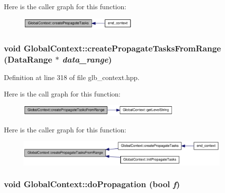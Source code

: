 Here is the caller graph for this function:\nopagebreak
\begin{figure}[H]
\begin{center}
\leavevmode
\includegraphics[width=167pt]{class_global_context_a0f3857165a2d4571d6ae82b86c6becbe_icgraph}
\end{center}
\end{figure}
\hypertarget{class_global_context_a24052ad1a783fc8860d47f6da220c321}{
\subsubsection[{createPropagateTasksFromRange}]{\setlength{\rightskip}{0pt plus 5cm}void GlobalContext::createPropagateTasksFromRange ({\bf DataRange} $\ast$ {\em data\_\-range})}}
\label{class_global_context_a24052ad1a783fc8860d47f6da220c321}


Definition at line 318 of file glb\_\-context.hpp.

Here is the call graph for this function:\nopagebreak
\begin{figure}[H]
\begin{center}
\leavevmode
\includegraphics[width=231pt]{class_global_context_a24052ad1a783fc8860d47f6da220c321_cgraph}
\end{center}
\end{figure}


Here is the caller graph for this function:\nopagebreak
\begin{figure}[H]
\begin{center}
\leavevmode
\includegraphics[width=302pt]{class_global_context_a24052ad1a783fc8860d47f6da220c321_icgraph}
\end{center}
\end{figure}
\hypertarget{class_global_context_a8f6d2fae9cd8687798b175ad75ba7974}{
\subsubsection[{doPropagation}]{\setlength{\rightskip}{0pt plus 5cm}void GlobalContext::doPropagation (bool {\em f})}}
\label{class_global_context_a8f6d2fae9cd8687798b175ad75ba7974}


